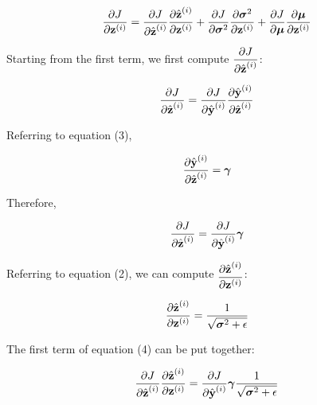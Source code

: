 \documentclass{article}
\begin{document}
\begin{multicols}{2}
\begin{equation}
    {\partial J \over \partial \textbf{z}^{(i)}} = {\partial J \over \partial \hat{\textbf{z}}^{(i)}}
    {\partial \hat{\textbf{z}}^{(i)} \over \partial \textbf{z}^{(i)}}
     + {\partial J \over \partial \boldsymbol{\sigma}^2} 
     {\partial \boldsymbol{\sigma}^2 \over \partial \textbf{z}^{(i)}}
     + {\partial J \over \partial \boldsymbol{\mu}}
     {\partial \boldsymbol{\mu} \over \partial \textbf{z}^{(i)}}
\end{equation}

Starting from the first term, we first compute $\begin{aligned}
    {\partial J \over \partial \hat{\textbf{z}}^{(i)}}
\end{aligned}$:

\begin{equation}
    {\partial J \over \partial \hat{\textbf{z}}^{(i)}} = 
    {\partial J \over \partial \hat{\textbf{y}}^{(i)}} 
    {\partial \hat{\textbf{y}}^{(i)} \over \partial \hat{\textbf{z}}^{(i)}} \notag
\end{equation}

Referring to equation (3), 

\begin{equation}
    {\partial \hat{\textbf{y}}^{(i)} \over \partial \hat{\textbf{z}}^{(i)}} = \boldsymbol{\gamma} \notag
\end{equation}

Therefore, 

\begin{equation}
    {\partial J \over \partial \hat{\textbf{z}}^{(i)}} = 
    {\partial J \over \partial \hat{\textbf{y}}^{(i)}} \boldsymbol{\gamma} \notag
\end{equation}

Referring to equation (2), we can compute $\begin{aligned}
    {\partial \hat{\textbf{z}}^{(i)} \over \partial \textbf{z}^{(i)}}
\end{aligned}$:

\begin{equation}
    {\partial \hat{\textbf{z}}^{(i)} \over \partial \textbf{z}^{(i)}} = 
    {1 \over \sqrt{\boldsymbol{\sigma}^2 + \epsilon}} \notag
\end{equation}

The first term of equation (4) can be put together:

\begin{equation}
    {\partial J \over \partial \hat{\textbf{z}}^{(i)}}
    {\partial \hat{\textbf{z}}^{(i)} \over \partial \textbf{z}^{(i)}} = {\partial J \over \partial \hat{\textbf{y}}^{(i)}}
    \boldsymbol{\gamma} 
    {1 \over \sqrt{\boldsymbol{\sigma}^2 + \epsilon}} 
\end{equation}


\end{multicols}
\end{document}
